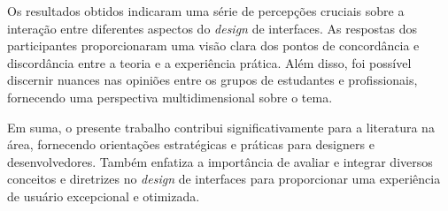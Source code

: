 Os resultados obtidos indicaram uma série de percepções cruciais sobre a interação entre diferentes aspectos do \textit{design} de interfaces. As respostas dos participantes proporcionaram uma visão clara dos pontos de concordância e discordância entre a teoria e a experiência prática. Além disso, foi possível discernir nuances nas opiniões entre os grupos de estudantes e profissionais, fornecendo uma perspectiva multidimensional sobre o tema.

Em suma, o presente trabalho contribui significativamente para a literatura na área, fornecendo orientações estratégicas e práticas para designers e desenvolvedores. Também enfatiza a importância de avaliar e integrar diversos conceitos e diretrizes no \textit{design} de interfaces para proporcionar uma experiência de usuário excepcional e otimizada.	




